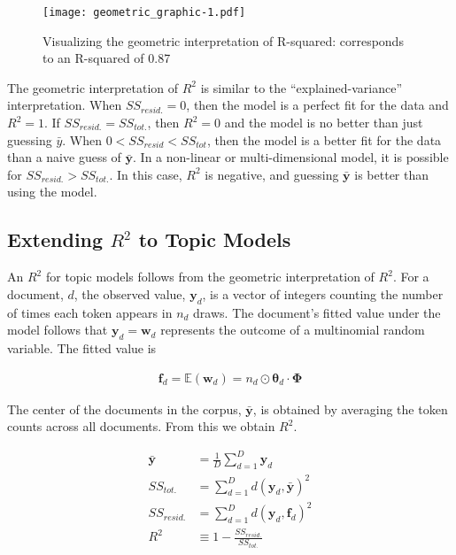 \documentclass[conference,final,]{IEEEtran}
\makeatletter
\def\maxwidth{\ifdim\Gin@nat@width>\linewidth\linewidth
\else\Gin@nat@width\fi}
\let\Oldincludegraphics\includegraphics
\renewcommand{\includegraphics}[1]{\Oldincludegraphics[width=\maxwidth]{#1}}
\makeatother
\begin{document}
\begin{figure}
\centering
\texttt{[image: geometric\_graphic-1.pdf]}
\caption{Visualizing the geometric interpretation of R-squared:
corresponds to an R-squared of 0.87}
\end{figure}

The geometric interpretation of \(R^2\) is similar to the
``explained-variance'' interpretation. When \(SS_{resid.} = 0\), then
the model is a perfect fit for the data and \(R^2 = 1\). If
\(SS_{resid.} = SS_{tot.}\), then \(R^2 = 0\) and the model is no better
than just guessing \(\bar{y}\). When \(0 < SS_{resid} < SS_{tot}\), then
the model is a better fit for the data than a naive guess of
\(\bar{\mathbf{y}}\). In a non-linear or multi-dimensional model, it is
possible for \(SS_{resid.} > SS_{tot.}\). In this case, \(R^2\) is
negative, and guessing \(\bar{\mathbf{y}}\) is better than using the
model.

\hypertarget{extending-r2-to-topic-models}{%
\subsection{\texorpdfstring{Extending \(R^2\) to Topic
Models}{Extending R\^{}2 to Topic Models}}\label{extending-r2-to-topic-models}}

An \(R^2\) for topic models follows from the geometric interpretation of
\(R^2\). For a document, \(d\), the observed value, \(\mathbf{y}_d\), is
a vector of integers counting the number of times each token appears in
\(n_d\) draws. The document's fitted value under the model follows that
\(\mathbf{y}_d = \mathbf{w}_d\) represents the outcome of a multinomial
random variable. The fitted value is

\begin{align}
  \mathbf{f}_d = 
    \mathbb{E}(\mathbf{w}_d) = 
    n_d \odot \boldsymbol\theta_d \cdot \boldsymbol\Phi 
\end{align}

The center of the documents in the corpus, \(\bar{\mathbf{y}}\), is
obtained by averaging the token counts across all documents. From this
we obtain \(R^2\).

\begin{align}
    \bar{\mathbf{y}} &= \frac{1}{D}\sum_{d=1}^{D}\mathbf{y}_d\\
    SS_{tot.} &= \sum_{d=1}^D{d(\mathbf{y}_d, \bar{\mathbf{y}})^2}\\
    SS_{resid.} &= \sum_{d=1}^D{d(\mathbf{y}_d, \mathbf{f}_d)^2}\\
    R^2 &\equiv 1 - \frac{SS_{resid.}}{SS_{tot.} }
\end{align}
\end{document}
